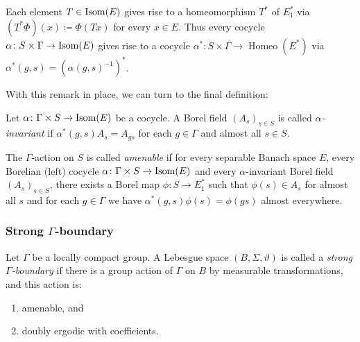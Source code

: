 \begin{rem}
  Each element \(T \in \operatorname{Isom}(E)\) gives rise to a homeomorphism \(T^\ast\) of \(E^\ast_1\) via \((T^\ast\Phi)(x) \coloneqq \Phi(Tx)\) for every \(x \in E\). Thus every cocycle \(\alpha \colon S \times \Gamma \to \operatorname{Isom}(E)\) gives rise to a cocycle \(\alpha^\ast \colon S \times \Gamma \to \operatorname{Homeo}(E^\ast)\) via \(\alpha^\ast (g, s) = (\alpha(g, s)^{-1})^\ast\).
\end{rem}

With this remark in place, we can turn to the final definition:

\begin{defin}
  Let \(\alpha\colon \Gamma \times S \to \operatorname{Isom}(E)\) be a cocycle. A Borel field \((A_s)_{s \in S}\) is called \emph{\(\alpha\)-invariant} if \(\alpha^\ast(g, s) A_{s} = A_{gs}\) for each \(g \in \Gamma\) and almost all \(s \in S\).

  The \(\Gamma\)-action on \(S\) is called \emph{amenable} if for every separable Banach space \(E\), every Borelian (left) cocycle \(\alpha \colon \Gamma \times S \to \operatorname{Isom}(E)\) and every \(\alpha\)-invariant Borel field \((A_s)_{s \in S}\), there exists a Borel map \(\phi \colon S \to E^\ast_1\) such that \(\phi(s) \in A_s\) for almost all \(s\) and for each \(g \in \Gamma\) we have \(\alpha^\ast(g, s) \phi(s) = \phi(gs)\) almost everywhere.
\end{defin}

\subsubsection*{Strong \(\Gamma\)-boundary}
\label{str-bdry}

\begin{defin}
  Let \(\Gamma\) be a locally compact group. A Lebesgue space \((B, \Sigma, \vartheta)\) is called a \emph{strong \(\Gamma\)-boundary} if there is a group action of \(\Gamma\) on \(B\) by measurable transformations, and this action is:
  \begin{enumerate}
  \item amenable, and
  \item doubly ergodic with coefficients.
  \end{enumerate}
\end{defin}

